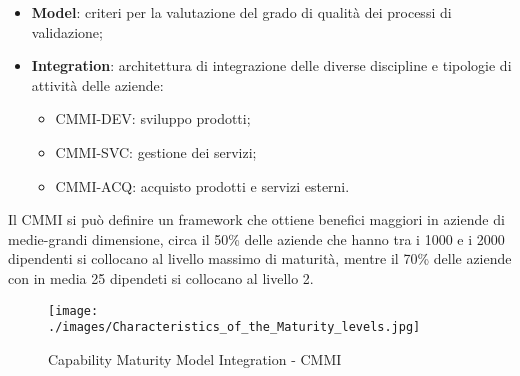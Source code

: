 \begin{itemize}
\begin{itemize}
	\end{itemize}
	\item \textbf{Model}: criteri per la valutazione del grado di qualità dei processi di validazione;
	\item \textbf{Integration}: architettura di integrazione delle diverse discipline e tipologie di attività delle aziende:
	\begin{itemize}
		\item CMMI-DEV: sviluppo prodotti;
		\item CMMI-SVC: gestione dei servizi;
		\item CMMI-ACQ: acquisto prodotti e servizi esterni.
	\end{itemize}	 
\end{itemize}
Il CMMI si può definire un framework che ottiene benefici maggiori in aziende di medie-grandi dimensione, circa il 50\% delle aziende che hanno tra i 1000 e i 2000 dipendenti si collocano al livello massimo di maturità, mentre il 70\% delle aziende con in media 25 dipendeti si collocano al livello 2.

\begin{figure}[H]
\centering
	\texttt{[image: ./images/Characteristics\_of\_the\_Maturity\_levels.jpg]} 
	\caption{Capability Maturity Model Integration - CMMI}
	\label{cmmi}
\end{figure}


